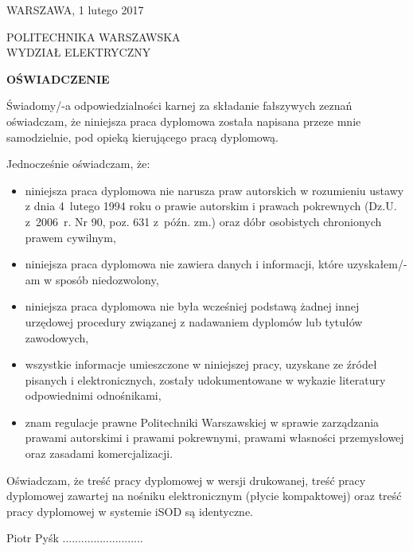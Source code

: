 \begin{flushright}
  WARSZAWA, 1 lutego 2017
\end{flushright}

\begin{flushleft}
POLITECHNIKA WARSZAWSKA \\
WYDZIAŁ ELEKTRYCZNY
\end{flushleft}

\begin{center}
\textbf{OŚWIADCZENIE}
\end{center}

Świadomy/-a odpowiedzialności karnej za składanie fałszywych zeznań oświadczam, że
niniejsza praca dyplomowa została napisana przeze mnie samodzielnie, pod opieką kierującego
pracą dyplomową.

Jednocześnie oświadczam, że:
\begin{itemize}
\item niniejsza praca dyplomowa nie narusza praw autorskich w rozumieniu ustawy z dnia
4~lutego 1994 roku o prawie autorskim i prawach pokrewnych (Dz.U. z~2006~r. Nr 90, poz.
631 z~późn. zm.) oraz dóbr osobistych chronionych prawem cywilnym,
\item niniejsza praca
dyplomowa nie zawiera danych i informacji, które uzyskałem/-am w sposób niedozwolony,
\item niniejsza praca dyplomowa nie była wcześniej podstawą żadnej innej urzędowej
procedury związanej z nadawaniem dyplomów lub tytułów zawodowych,
\item wszystkie
informacje umieszczone w niniejszej pracy, uzyskane ze źródeł pisanych i elektronicznych,
zostały udokumentowane w wykazie literatury odpowiednimi odnośnikami,
\item znam
regulacje prawne Politechniki Warszawskiej w sprawie zarządzania prawami autorskimi i
prawami pokrewnymi, prawami własności przemysłowej oraz zasadami komercjalizacji.
\end{itemize}

Oświadczam, że treść pracy dyplomowej w wersji drukowanej, treść pracy dyplomowej
zawartej na nośniku elektronicznym (płycie kompaktowej) oraz treść pracy dyplomowej w
systemie iSOD są identyczne.

\begin{flushright}
  Piotr Pyśk ..........................
\end{flushright}